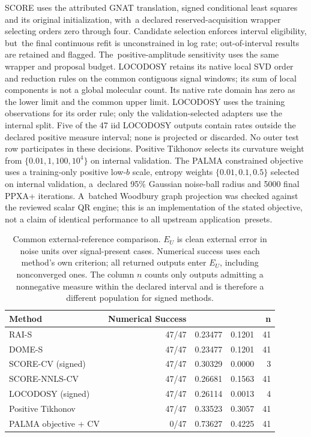 \documentclass[mathematics,article,accept,moreauthors]{Definitions/mdpi}
\begin{document}
SCORE uses the attributed GNAT translation, signed conditional least squares
and its original initialization, with~a declared reserved-acquisition wrapper
selecting orders zero through four. Candidate selection enforces interval
eligibility, but~the final continuous refit is unconstrained in log rate;
out-of-interval results are retained and flagged. The~positive-amplitude
sensitivity uses the same wrapper and proposal budget. LOCODOSY retains its native local SVD
order and reduction rules on the common contiguous signal windows; its sum of
local components is not a global molecular count. Its native rate domain has
zero as the lower limit and the common upper limit. LOCODOSY uses the training
observations for its order rule; only the validation-selected adapters use
the internal split. Five of the 47 iid LOCODOSY outputs contain rates outside
the declared positive measure interval; none is projected or discarded.
No outer test row participates in these decisions. Positive Tikhonov selects
its curvature weight from $\{0.01,1,100,10^4\}$ on internal validation.
The PALMA constrained objective uses a training-only positive low-$b$ scale,
entropy weights $\{0.01,0.1,0.5\}$ selected on internal validation, a~declared
95\% Gaussian noise-ball radius and 5000 final PPXA+ iterations. A~batched
Woodbury graph projection was checked against the reviewed scalar QR engine;
this is an implementation of the stated objective, not a claim of identical
performance to all upstream application~presets.

\begin{table}[H]\small
\caption{Common 
 external-reference comparison. $E_U$ is clean external error
in noise units over signal-present cases. Numerical success uses each method's
own criterion; all returned outputs enter $E_U$, including nonconverged ones.
The column $n$ counts only outputs admitting a nonnegative
measure within the declared interval and is therefore a different population
for signed methods.}\label{tab:externalexecuted}
\begin{tabularx}{\textwidth}{LRRRR}\toprule
\textbf{Method} & \textbf{Numerical Success} &  &  & \textbf{n}\\\midrule
RAI-S & 47/47 & 0.23477 & 0.1201 & 41 
\\
DOME-S & 47/47 & 0.23477 & 0.1201 & 41\\
SCORE-CV (signed) & 47/47 & 0.30329 & 0.0000 & 3\\
SCORE-NNLS-CV & 47/47 & 0.26681 & 0.1563 & 41\\
LOCODOSY (signed) & 47/47 & 0.26114 & 0.0013 & 4\\
Positive Tikhonov & 47/47 & 0.33523 & 0.3057 & 41\\
PALMA objective + CV & 0/47 & 0.73627 & 0.4225 & 41\\
\bottomrule\end{tabularx}\end{table}
\end{document}
